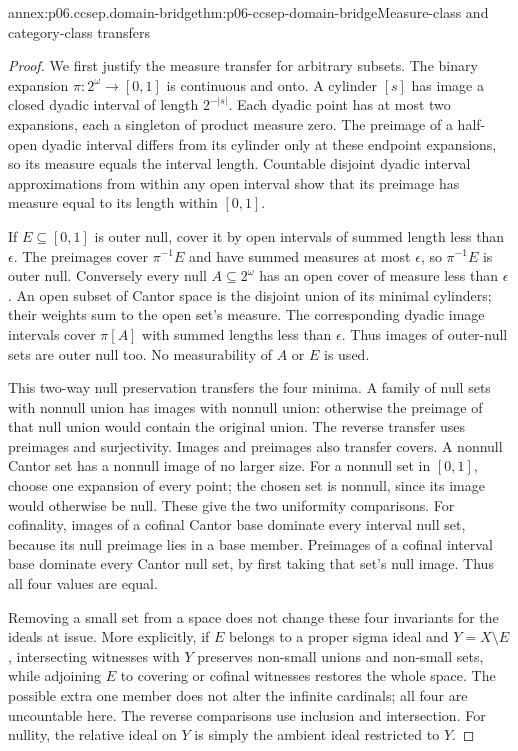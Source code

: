 \begin{annexitem}{annex:p06.ccsep.domain-bridge}{thm:p06-ccsep-domain-bridge}{Measure-class and category-class transfers}
\begin{proof}
We first justify the measure transfer for arbitrary subsets. The binary
expansion \(\pi:2^\omega\to[0,1]\) is continuous and onto. A
cylinder \([s]\) has image a closed dyadic interval of length
\(2^{-|s|}\). Each dyadic point has at most two expansions, each a
singleton of product measure zero. The preimage of a half-open dyadic
interval differs from its cylinder only at these endpoint expansions,
so its measure equals the interval length. Countable disjoint dyadic
interval approximations from within any open interval show that its
preimage has measure equal to its length within \([0,1]\).

If \(E\subseteq[0,1]\) is outer null, cover it by open intervals of
summed length less than \(\epsilon\). The preimages cover
\(\pi^{-1}E\) and have summed measures at most \(\epsilon\), so
\(\pi^{-1}E\) is outer null. Conversely every null
\(A\subseteq2^\omega\) has an open cover of measure less than
\(\epsilon\). An open subset of Cantor space is the disjoint union
of its minimal cylinders; their weights sum to the open set's measure.
The corresponding dyadic image intervals cover \(\pi[A]\) with
summed lengths less than \(\epsilon\). Thus images of outer-null
sets are outer null too. No measurability of \(A\) or \(E\) is
used.

This two-way null preservation transfers the four minima. A family of
null sets with nonnull union has images with nonnull union: otherwise
the preimage of that null union would contain the original union.
The reverse transfer uses preimages and surjectivity. Images and
preimages also transfer covers. A nonnull Cantor set has a nonnull
image of no larger size. For a nonnull set in \([0,1]\), choose one
expansion of every point; the chosen set is nonnull, since its image
would otherwise be null. These give the two uniformity comparisons.
For cofinality, images of a cofinal Cantor base dominate every interval
null set, because its null preimage lies in a base member. Preimages
of a cofinal interval base dominate every Cantor null set, by first
taking that set's null image. Thus all four values are equal.

Removing a small set from a space does not change these four invariants
for the ideals at issue. More explicitly, if \(E\) belongs to a proper
sigma ideal and \(Y=X\setminus E\), intersecting witnesses with
\(Y\) preserves non-small unions and non-small sets, while adjoining
\(E\) to covering or cofinal witnesses restores the whole space.
The possible extra one member does not alter the infinite cardinals;
all four are uncountable here. The reverse comparisons use inclusion
and intersection. For nullity, the relative ideal on \(Y\) is simply
the ambient ideal restricted to \(Y\).


\end{proof}
\end{annexitem}
